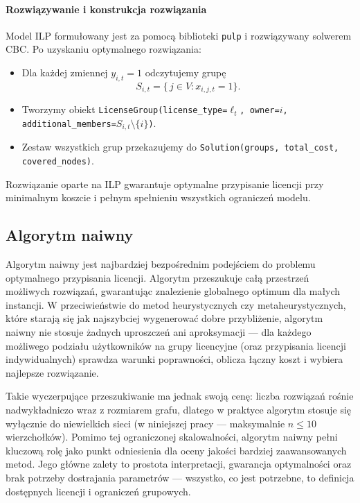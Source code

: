 \paragraph{Rozwiązywanie i konstrukcja rozwiązania}  
Model ILP formułowany jest za pomocą biblioteki \texttt{pulp} i rozwiązywany solwerem CBC. Po uzyskaniu optymalnego rozwiązania:
\begin{itemize}
  \item Dla każdej zmiennej $y_{i,t}=1$ odczytujemy grupę
    \[
      S_{i,t} = \{\,j\in V : x_{i,j,t}=1\}.
    \]
  \item Tworzymy obiekt \texttt{LicenseGroup(license\_type=\(\ell_t\), owner=\(i\), additional\_members=\(S_{i,t}\setminus\{i\}\))}.
  \item Zestaw wszystkich grup przekazujemy do \texttt{Solution(groups, total\_cost, covered\_nodes)}.
\end{itemize}

Rozwiązanie oparte na ILP gwarantuje optymalne przypisanie licencji przy minimalnym koszcie i pełnym spełnieniu wszystkich ograniczeń modelu.



\subsection{Algorytm naiwny}

Algorytm naiwny jest najbardziej bezpośrednim podejściem do problemu optymalnego przypisania licencji. Algorytm przeszukuje całą przestrzeń możliwych rozwiązań, gwarantując znalezienie globalnego optimum dla małych instancji. W przeciwieństwie do metod heurystycznych czy metaheurystycznych, które starają się jak najszybciej wygenerować dobre przybliżenie, algorytm naiwny nie stosuje żadnych uproszczeń ani aproksymacji — dla każdego możliwego podziału użytkowników na grupy licencyjne (oraz przypisania licencji indywidualnych) sprawdza warunki poprawności, oblicza łączny koszt i wybiera najlepsze rozwiązanie.

Takie wyczerpujące przeszukiwanie ma jednak swoją cenę: liczba rozwiązań rośnie nadwykładniczo wraz z rozmiarem grafu, dlatego w praktyce algorytm stosuje się wyłącznie do niewielkich sieci (w niniejszej pracy — maksymalnie $n\le10$ wierzchołków). Pomimo tej ograniczonej skalowalności, algorytm naiwny pełni kluczową rolę jako punkt odniesienia dla oceny jakości bardziej zaawansowanych metod. Jego główne zalety to prostota interpretacji, gwarancja optymalności oraz brak potrzeby dostrajania parametrów — wszystko, co jest potrzebne, to definicja dostępnych licencji i ograniczeń grupowych.

